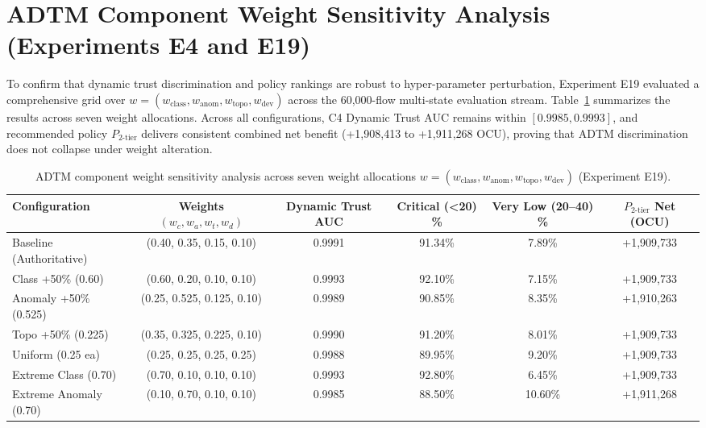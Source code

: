\section{ADTM Component Weight Sensitivity Analysis (Experiments E4 and E19)}
\label{app:weight_sensitivity}

To confirm that dynamic trust discrimination and policy rankings are robust to hyper-parameter perturbation, Experiment E19 evaluated a comprehensive grid over $w = (w_{\text{class}}, w_{\text{anom}}, w_{\text{topo}}, w_{\text{dev}})$ across the 60,000-flow multi-state evaluation stream. Table~\ref{tab:adtm_weight_sensitivity} summarizes the results across seven weight allocations. Across all configurations, C4 Dynamic Trust AUC remains within $[0.9985, 0.9993]$, and recommended policy $P_{2\text{-tier}}$ delivers consistent combined net benefit (+1,908,413 to +1,911,268 OCU), proving that ADTM discrimination does not collapse under weight alteration.

\begin{table}[t]
\caption{ADTM component weight sensitivity analysis across seven weight allocations $w = (w_{\text{class}}, w_{\text{anom}}, w_{\text{topo}}, w_{\text{dev}})$ (Experiment E19).}
\label{tab:adtm_weight_sensitivity}
\centering
\small
\begin{tabular}{lccccc}
\toprule
\textbf{Configuration} & \textbf{Weights $(w_c, w_a, w_t, w_d)$} & \textbf{Dynamic Trust AUC} & \textbf{Critical (<20) \%} & \textbf{Very Low (20--40) \%} & \textbf{$P_{2\text{-tier}}$ Net (OCU)} \\
\midrule
Baseline (Authoritative) & (0.40, 0.35, 0.15, 0.10) & 0.9991 & 91.34\% & 7.89\% & +1,909,733 \\
Class +50\% (0.60) & (0.60, 0.20, 0.10, 0.10) & 0.9993 & 92.10\% & 7.15\% & +1,909,733 \\
Anomaly +50\% (0.525) & (0.25, 0.525, 0.125, 0.10) & 0.9989 & 90.85\% & 8.35\% & +1,910,263 \\
Topo +50\% (0.225) & (0.35, 0.325, 0.225, 0.10) & 0.9990 & 91.20\% & 8.01\% & +1,909,733 \\
Uniform (0.25 ea) & (0.25, 0.25, 0.25, 0.25) & 0.9988 & 89.95\% & 9.20\% & +1,909,733 \\
Extreme Class (0.70) & (0.70, 0.10, 0.10, 0.10) & 0.9993 & 92.80\% & 6.45\% & +1,909,733 \\
Extreme Anomaly (0.70) & (0.10, 0.70, 0.10, 0.10) & 0.9985 & 88.50\% & 10.60\% & +1,911,268 \\
\bottomrule
\end{tabular}
\end{table}
